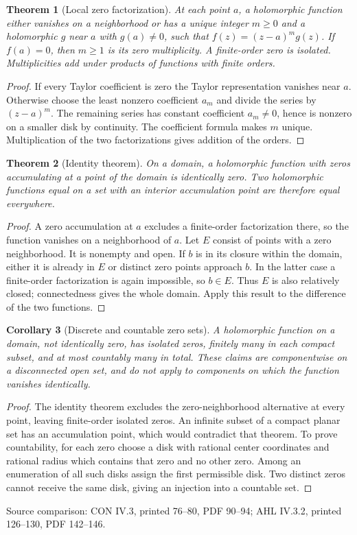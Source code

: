 \documentclass[11pt,a4paper,openany]{book}
\newtheorem{theorem}{Theorem}[chapter]
\newtheorem{corollary}[theorem]{Corollary}
\theoremstyle{definition}
\theoremstyle{remark}\newtheorem{remark}[theorem]{Remark}
\newcommand{\family}[1]{}
\newcommand{\source}[1]{\par\begingroup\small\sffamily\color{black!65}Source comparison: #1\par\endgroup}
\begin{document}
\begin{theorem}[Local zero factorization]\family{D12.05.03}\label{d12:05-03}
At each point \(a\), a holomorphic function either vanishes on a
neighborhood or has a unique integer \(m\ge0\) and a holomorphic \(g\)
near \(a\) with \(g(a)\ne0\), such that
\(f(z)=(z-a)^m g(z)\). If \(f(a)=0\), then \(m\ge1\) is its zero
multiplicity. A finite-order zero is isolated. Multiplicities add under
products of functions with finite orders.
\end{theorem}
\begin{proof}
If every Taylor coefficient is zero the Taylor representation vanishes
near \(a\). Otherwise choose the least nonzero coefficient \(a_m\)
and divide the series by \((z-a)^m\).
The remaining series has constant coefficient \(a_m\ne0\), hence is
nonzero on a smaller disk by continuity. The coefficient formula
makes \(m\) unique. Multiplication of the two factorizations gives
addition of the orders.
\end{proof}

\begin{theorem}[Identity theorem]\family{D12.05.04}\label{d12:05-04}
On a domain, a holomorphic function with zeros accumulating at a point
of the domain is identically zero. Two holomorphic functions equal on
a set with an interior accumulation point are therefore equal everywhere.
\end{theorem}
\begin{proof}
A zero accumulation at \(a\) excludes a finite-order factorization there,
so the function vanishes on a neighborhood of \(a\).
Let \(E\) consist of points with a zero neighborhood. It is nonempty
and open. If \(b\) is in its closure within the domain, either it is
already in \(E\) or distinct zero points approach \(b\). In the latter
case a finite-order factorization is again impossible, so \(b\in E\).
Thus \(E\) is also relatively closed; connectedness gives the whole
domain. Apply this result to the difference of the two functions.
\end{proof}

\begin{corollary}[Discrete and countable zero sets]\label{d12:05-03-discrete}
A holomorphic function on a domain, not identically zero, has isolated
zeros, finitely many in each compact subset, and at most countably many
in total. These claims are componentwise on a disconnected open set,
and do not apply to components on which the function vanishes identically.
\end{corollary}
\begin{proof}
The identity theorem excludes the zero-neighborhood alternative at every
point, leaving finite-order isolated zeros.
An infinite subset of a compact planar set has an accumulation point,
which would contradict that theorem. To prove countability, for each zero
choose a disk with rational center coordinates and rational radius which
contains that zero and no other zero. Among an enumeration of all such
disks assign the first permissible disk. Two distinct zeros cannot receive
the same disk, giving an injection into a countable set.
\end{proof}
\source{CON IV.3, printed 76--80, PDF 90--94; AHL IV.3.2, printed 126--130, PDF 142--146.}
\end{document}

